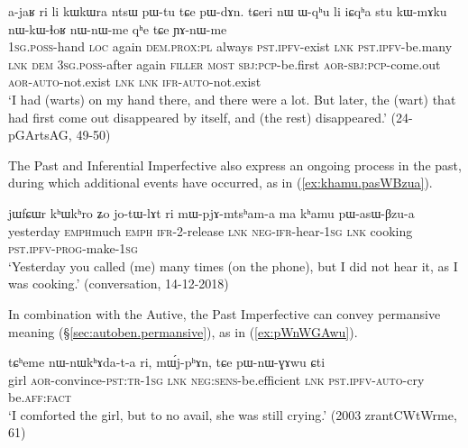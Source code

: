 \begin{exe}
\ex \label{ex:pWtu.pWdAn}
\gll a-jaʁ ri li kɯkɯra ntsɯ pɯ-tu tɕe pɯ-dɤn. tɕeri nɯ ɯ-qʰu li iɕqʰa stu kɯ-mɤku nɯ-kɯ-ɬoʁ nɯ-nɯ-me qʰe tɕe ɲɤ-nɯ-me \\
\textsc{1sg}.\textsc{poss}-hand \textsc{loc} again \textsc{dem}.\textsc{prox}:\textsc{pl} always \textsc{pst}.\textsc{ipfv}-exist \textsc{lnk} \textsc{pst}.\textsc{ipfv}-be.many \textsc{lnk} \textsc{dem} \textsc{3sg}.\textsc{poss}-after again \textsc{filler} \textsc{most} \textsc{sbj}:\textsc{pcp}-be.first \textsc{aor}-\textsc{sbj}:\textsc{pcp}-come.out \textsc{aor}-\textsc{auto}-not.exist \textsc{lnk} \textsc{lnk} \textsc{ifr}-\textsc{auto}-not.exist \\
\glt `I had (warts) on my hand there, and there were a lot. But later, the (wart) that had first come out disappeared by itself, and (the rest) disappeared.' (24-pGArtsAG, 49-50)
\end{exe}

The Past and Inferential Imperfective also express an ongoing process in the past, during which additional events have occurred, as in (\ref{ex:khamu.pasWBzua}).

\begin{exe}
\ex \label{ex:khamu.pasWBzua}
\gll jɯfɕɯr kʰɯ\redp{}kʰro ʑo jo-tɯ-lɤt ri mɯ-pjɤ-mtsʰam-a ma kʰamu pɯ-asɯ-βzu-a   \\
yesterday \textsc{emph}\redp{}much \textsc{emph} \textsc{ifr}-2-release \textsc{lnk} \textsc{neg}-\textsc{ifr}-hear-\textsc{1sg} \textsc{lnk} cooking \textsc{pst}.\textsc{ipfv}-\textsc{prog}-make-\textsc{1sg} \\
\glt `Yesterday you called (me) many times (on the phone), but I did not hear it, as I was cooking.' (conversation, 14-12-2018)
\end{exe}


In combination with the Autive, the Past Imperfective can convey permansive meaning (§\ref{sec:autoben.permansive}), as in (\ref{ex:pWnWGAwu}).

\begin{exe}
\ex \label{ex:pWnWGAwu}
\gll tɕʰeme nɯ-nɯkʰɤda-t-a ri, mɯ́j-pʰɤn, tɕe pɯ-nɯ-ɣɤwu ɕti \\
girl \textsc{aor}-convince-\textsc{pst}:\textsc{tr}-\textsc{1sg} \textsc{lnk} \textsc{neg}:\textsc{sens}-be.efficient \textsc{lnk} \textsc{pst}.\textsc{ipfv}-\textsc{auto}-cry be.\textsc{aff}:\textsc{fact} \\
\glt `I comforted the girl, but to no avail, she was still crying.' (2003 zrantCWtWrme, 61)
\end{exe}

